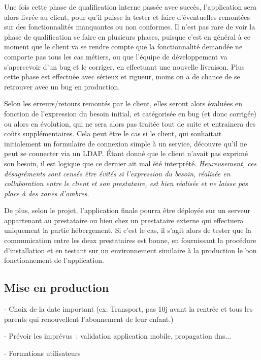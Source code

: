 Une fois cette phase de qualification interne passée avec succès, l'application sera alors livrée au client, pour qu'il puisse la tester et faire d'éventuelles remontées sur des fonctionnalités manquantes ou non conformes. Il n'est pas rare de voir la phase de qualification se faire en plusieurs phases, puisque c'est en général à ce moment que le client va se rendre compte que la fonctionnalité demandée ne comporte pas tous les cas métiers, ou que l'équipe de développement va s'apercevoir d'un bug et le corriger, en effectuant une nouvelle livraison. Plus cette phase est effectuée avec sérieux et rigueur, moins on a de chance de se retrouver avec un bug en production. 

Selon les erreurs/retours remontés par le client, elles seront alors évaluées en fonction de l'expression du besoin initial, et catégorisée en bug (et donc corrigée) ou alors en évolution, qui ne sera alors pas traitée tout de suite et entrainera des coûts supplémentaires. Cela peut être le cas si le client, qui souhaitait initialement un formulaire de connexion simple à un service, découvre qu'il ne peut se connecter via un \gls{LDAP}. Étant donné que le client n'avait pas exprimé son besoin, il est logique que ce dernier ait mal été interprété. \emph{Heureusement, ces désagréments sont censés être évités si l'expression du besoin, réalisée en collaboration entre le client et son prestataire, est bien réalisée et ne laisse pas place à des zones d'ombres.}

De plus, selon le projet, l'application finale pourra être déployée sur un serveur appartenant au prestataire ou bien chez un prestataire externe qui effectuera uniquement la partie hébergement. Si c'est le cas, il s'agit alors de tester que la communication entre les deux prestataires est bonne, en fournissant la procédure d'installation et en testant sur un environnement similaire à la production le bon fonctionnement de l'application.

\subsection{Mise en production}

- Choix de la date important (ex: Transport, pas 10j avant la rentrée et tous les parents qui renouvellent l'abonnement de leur enfant.)

- Prévoir les imprévus : validation application mobile, propagation dns...

- Formations utilisateurs

